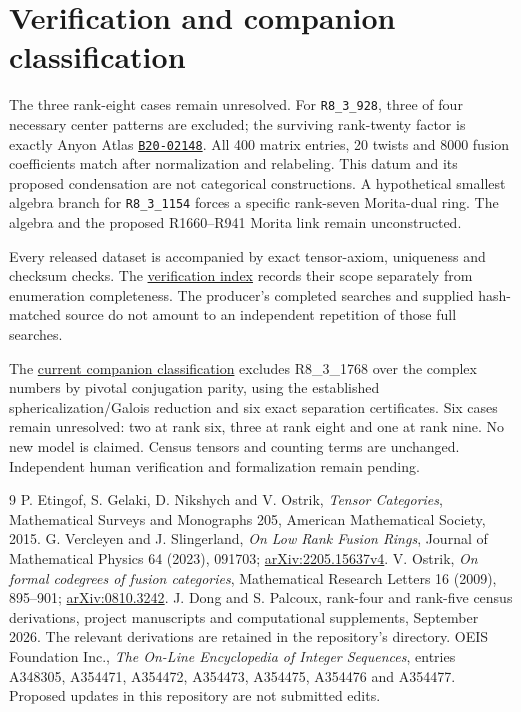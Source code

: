 \documentclass[11pt,a4paper]{article}
\theoremstyle{definition}\newtheorem{definition}[theorem]{Definition}\newtheorem{remark}[theorem]{Remark}
\begin{document}
\section{Verification and companion classification}

The three rank-eight cases remain unresolved. For \texttt{R8\_3\_928},
three of four necessary center patterns are excluded; the surviving
rank-twenty factor is exactly Anyon Atlas
\href{https://anyonatlas.org/data/B20-02148}{\texttt{B20-02148}}.
All 400 matrix entries, 20 twists and 8000 fusion coefficients match
after normalization and relabeling. This datum and its proposed
condensation are not categorical constructions. A hypothetical smallest
algebra branch for \texttt{R8\_3\_1154} forces a specific rank-seven
Morita-dual ring. The algebra and the proposed R1660--R941 Morita link
remain unconstructed.



Every released dataset is accompanied by exact tensor-axiom, uniqueness and
checksum checks. The \href{https://github.com/sebastienpalcoux/fusion-ring-census/blob/main/verification/README.md}{verification index}
records their scope separately from enumeration completeness. The producer's
completed searches and supplied hash-matched source do not amount to an
independent repetition of those full searches.

The \href{https://github.com/sebastienpalcoux/grothendieck-ring-classification/blob/main/evidence/frontier/README.md}{current companion classification}
excludes R8\_3\_1768 over the complex numbers by pivotal conjugation parity,
using the established sphericalization/Galois reduction and six exact
separation certificates. Six cases remain unresolved: two at rank six, three at rank eight and one at rank nine. No new model is claimed. Census
tensors and counting terms are unchanged. Independent human verification
and formalization remain pending.

\begin{thebibliography}{9}\small\setlength{\itemsep}{2pt}
 P. Etingof, S. Gelaki, D. Nikshych and V. Ostrik,
\emph{Tensor Categories}, Mathematical Surveys and Monographs 205,
American Mathematical Society, 2015.
 G. Vercleyen and J. Slingerland,
\emph{On Low Rank Fusion Rings}, Journal of Mathematical Physics 64 (2023),
091703; \href{https://arxiv.org/abs/2205.15637v4}{arXiv:2205.15637v4}.
 V. Ostrik, \emph{On formal codegrees of fusion categories},
Mathematical Research Letters 16 (2009), 895--901;
\href{https://arxiv.org/abs/0810.3242}{arXiv:0810.3242}.
 J. Dong and S. Palcoux, rank-four and rank-five census derivations,
project manuscripts and computational supplements, September 2026.
The relevant derivations are retained in the repository's  directory.
 OEIS Foundation Inc., \emph{The On-Line Encyclopedia of Integer
Sequences}, entries A348305, A354471, A354472, A354473, A354475, A354476
and A354477. Proposed updates in this repository are not submitted edits.
\end{thebibliography}
\end{document}
